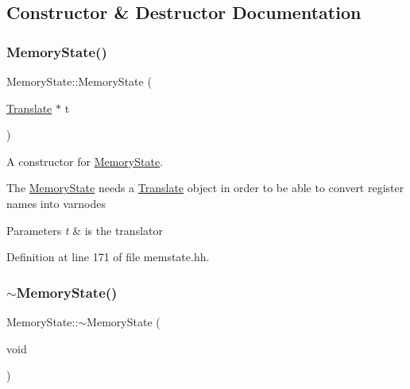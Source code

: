 \subsection{Constructor \& Destructor Documentation}
\mbox{\label{class_memory_state_a99b4d8fc22d89ffdcaaef799ffaf7909}} 
\subsubsection{\texorpdfstring{MemoryState()}{MemoryState()}}
{\footnotesize\ttfamily Memory\+State\+::\+Memory\+State (\begin{DoxyParamCaption}\item[{\mbox{\hyperlink{class_translate}{Translate}} $\ast$}]{t }\end{DoxyParamCaption})\hspace{0.3cm}{\ttfamily [inline]}}



A constructor for \mbox{\hyperlink{class_memory_state}{Memory\+State}}. 

The \mbox{\hyperlink{class_memory_state}{Memory\+State}} needs a \mbox{\hyperlink{class_translate}{Translate}} object in order to be able to convert register names into varnodes 
\begin{DoxyParams}{Parameters}
{\em t} & is the translator \\
\hline
\end{DoxyParams}


Definition at line 171 of file memstate.\+hh.

\mbox{\label{class_memory_state_abaeb9c50eb22aa5110edb57461be41c3}} 
\subsubsection{\texorpdfstring{$\sim$MemoryState()}{~MemoryState()}}
{\footnotesize\ttfamily Memory\+State\+::$\sim$\+Memory\+State (\begin{DoxyParamCaption}\item[{void}]{ }\end{DoxyParamCaption})\hspace{0.3cm}{\ttfamily [inline]}}




